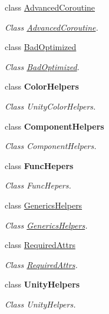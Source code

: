 \begin{DoxyCompactItemize}
\item 
class \hyperlink{class_lerp2_a_p_i_1_1_hepers_1_1_unity___extensions_1_1_advanced_coroutine}{Advanced\+Coroutine}
\begin{DoxyCompactList}\small\item\em Class \hyperlink{class_lerp2_a_p_i_1_1_hepers_1_1_unity___extensions_1_1_advanced_coroutine}{Advanced\+Coroutine}. \end{DoxyCompactList}\item 
class \hyperlink{class_lerp2_a_p_i_1_1_hepers_1_1_unity___extensions_1_1_bad_optimized}{Bad\+Optimized}
\begin{DoxyCompactList}\small\item\em Class \hyperlink{class_lerp2_a_p_i_1_1_hepers_1_1_unity___extensions_1_1_bad_optimized}{Bad\+Optimized}. \end{DoxyCompactList}\item 
class {\bfseries Color\+Helpers}
\begin{DoxyCompactList}\small\item\em Class Unity\+Color\+Helpers. \end{DoxyCompactList}\item 
class {\bfseries Component\+Helpers}
\begin{DoxyCompactList}\small\item\em Class Component\+Helpers. \end{DoxyCompactList}\item 
class {\bfseries Func\+Hepers}
\begin{DoxyCompactList}\small\item\em Class Func\+Hepers. \end{DoxyCompactList}\item 
class \hyperlink{class_lerp2_a_p_i_1_1_hepers_1_1_unity___extensions_1_1_generics_helpers}{Generics\+Helpers}
\begin{DoxyCompactList}\small\item\em Class \hyperlink{class_lerp2_a_p_i_1_1_hepers_1_1_unity___extensions_1_1_generics_helpers}{Generics\+Helpers}. \end{DoxyCompactList}\item 
class \hyperlink{class_lerp2_a_p_i_1_1_hepers_1_1_unity___extensions_1_1_required_attrs}{Required\+Attrs}
\begin{DoxyCompactList}\small\item\em Class \hyperlink{class_lerp2_a_p_i_1_1_hepers_1_1_unity___extensions_1_1_required_attrs}{Required\+Attrs}. \end{DoxyCompactList}\item 
class {\bfseries Unity\+Helpers}
\begin{DoxyCompactList}\small\item\em Class Unity\+Helpers. \end{DoxyCompactList}\end{DoxyCompactItemize}

